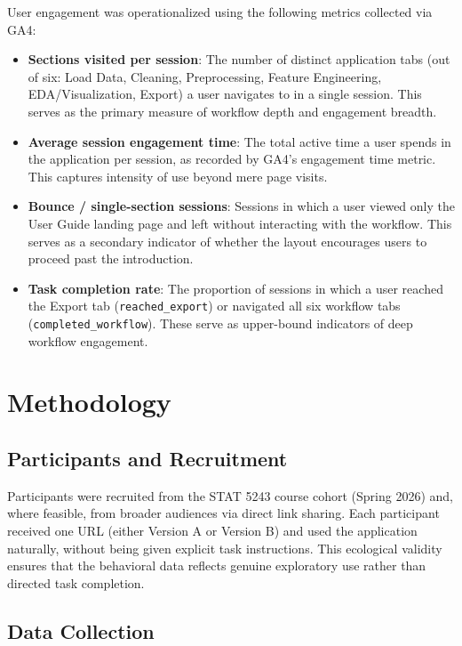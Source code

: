 \documentclass{article}
\begin{document}
User engagement was operationalized using the following metrics collected via GA4:

\begin{itemize}
    \item \textbf{Sections visited per session}: The number of distinct application tabs (out of six: Load Data, Cleaning, Preprocessing, Feature Engineering, EDA/Visualization, Export) a user navigates to in a single session. This serves as the primary measure of workflow depth and engagement breadth.
        \item \textbf{Average session engagement time}: The total active time a user spends in the application per session, as recorded by GA4's engagement time metric. This captures intensity of use beyond mere page visits.
            \item \textbf{Bounce / single-section sessions}: Sessions in which a user viewed only the User Guide landing page and left without interacting with the workflow. This serves as a secondary indicator of whether the layout encourages users to proceed past the introduction.
            \item \textbf{Task completion rate}: The proportion of sessions in which a user reached the Export tab (\texttt{reached\_export}) or navigated all six workflow tabs (\texttt{completed\_workflow}). These serve as upper-bound indicators of deep workflow engagement.
            \end{itemize}

            \section{Methodology}

            \subsection{Participants and Recruitment}

            Participants were recruited from the STAT 5243 course cohort (Spring 2026) and, where feasible, from broader audiences via direct link sharing. Each participant received one URL (either Version A or Version B) and used the application naturally, without being given explicit task instructions. This ecological validity ensures that the behavioral data reflects genuine exploratory use rather than directed task completion.

            \subsection{Data Collection}
\end{document}
